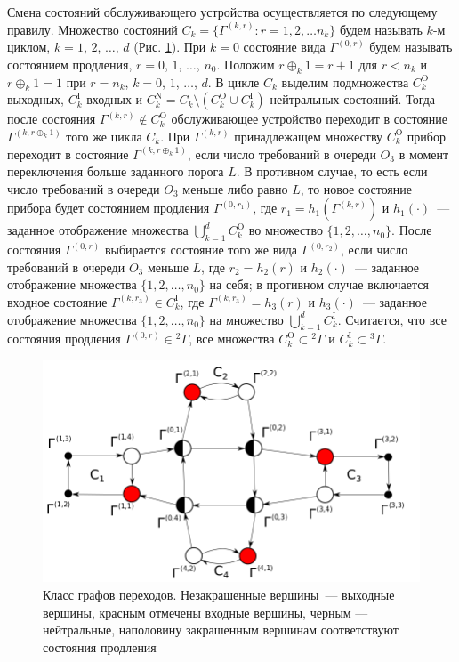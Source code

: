 \documentclass[a4paper,12pt,russian]{extarticle}
\newcommand{\G}{\Gamma}
\newcommand{\ga}[1]{\Gamma^{\left( #1 \right)} }
\begin{document}
Смена состояний обслуживающего устройства осуществляется по следующему правилу. Множество состояний $C_k = \{\G^{(k,r)} \colon r=1,2,\ldots n_k\}$ будем называть $k$-м циклом, $k=1$, $2$, $\ldots$, $d$ (Рис. \ref{GraphScheme}). При $k=0$ состояние вида $\ga{0,r}$ будем называть состоянием продления, $r=0$, $1$, $\ldots$, $n_0$. Положим $r \oplus_k 1 = r+1$ для $r<n_k$ и $r \oplus_k 1 = 1$ при $r=n_k$, $k = 0$, $1$, $\ldots$, $d$. В цикле $C_k$ выделим подмножества $C_k^{\mathrm{O}}$ выходных, $C_k^{\mathrm{I}}$ входных и $C_k^{\mathrm{N}} = C_k \setminus (C_k^{\mathrm{O}} \cup C_k^{\mathrm{I}})$ нейтральных состояний. Тогда после состояния $\ga{k,r} \not\in C_k^{\mathrm{O}}$ обслуживающее устройство переходит в состояние $\ga{k,r \oplus_k 1}$ того же цикла $C_k$. При $\ga{k,r}$ принадлежащем множеству $C_k^{\mathrm{O}}$ прибор переходит в состояние $\ga{k,r\oplus_k 1}$, если число требований в очереди $O_3$ в момент переключения больше заданного порога $L$. В противном случае, то есть если число требований в очереди $O_3$ меньше либо равно $L$, то новое состояние прибора будет состоянием продления $\ga{0,r_1}$, где $r_1=h_1(\ga{k,r})$ и $h_1(\cdot)$~--- заданное отображение множества $\bigcup\limits_{k=1}^d C_k^{\mathrm{O}}$ во множество $\{1,2,\ldots, n_0\}$. После состояния $\ga{0,r}$ выбирается состояние того же вида $\ga{0,r_2}$, если число требований в очереди $O_3$ меньше $L$, где $r_2=h_2(r)$ и $h_2(\cdot)$~--- заданное отображение множества $\{1,2, \ldots, n_0\}$ на себя; в противном случае включается входное состояние $\ga{k,r_3} \in C_k^{\mathrm{I}}$, где $\ga{k,r_3}=h_3(r)$ и $h_3(\cdot)$~--- заданное отображение множества $\{1,2, \ldots, n_0\}$ на множество  $\bigcup\limits_{k=1}^d C_k^{\mathrm{I}}$. Считается, что все состояния продления $\ga{0,r} \in {}^2 \G$, все множества $C_k^\mathrm{O}\subset {}^2 \G$ и $C_k^\mathrm{I}\subset {}^3 \G$.

\begin{figure}[hb]\centering
\includegraphics[scale=0.5]{GraphScheme3.png} 
\caption{Класс графов переходов. Незакрашенные вершины~--- выходные вершины, красным отмечены входные вершины, черным --- нейтральные, наполовину закрашенным вершинам соответствуют состояния продления}
\label{GraphScheme}
\end{figure}
\end{document}
